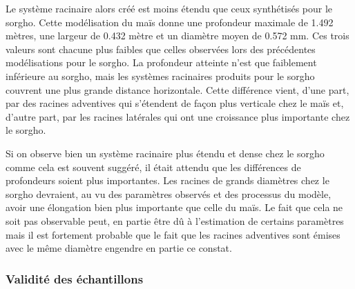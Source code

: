 Le système racinaire alors créé est moins étendu que ceux synthétisés pour le sorgho.
Cette modélisation du maïs donne une profondeur maximale de 1.492 mètres, une largeur de 0.432 mètre et un diamètre moyen de 0.572 mm.
Ces trois valeurs sont chacune plus faibles que celles observées lors des précédentes modélisations pour le sorgho.
La profondeur atteinte n'est que faiblement inférieure au sorgho, mais les systèmes racinaires produits pour le sorgho couvrent une plus grande distance horizontale.
Cette différence vient, d'une part, par des racines adventives qui s'étendent de façon plus verticale chez le maïs et, d'autre part, par les racines latérales qui ont une croissance plus importante chez le sorgho.
\newline

Si on observe bien un système racinaire plus étendu et dense chez le sorgho comme cela est souvent suggéré, il était attendu que les différences de profondeurs soient plus importantes.
Les racines de grands diamètres chez le sorgho devraient, au vu des paramètres observés et des processus du modèle, avoir une élongation bien plus importante que celle du maïs.
Le fait que cela ne soit pas observable peut, en partie être dû à l'estimation de certains paramètres mais il est fortement probable que le fait que les racines adventives sont émises avec le même diamètre engendre en partie ce constat.

\subsubsection{Validité des échantillons}

